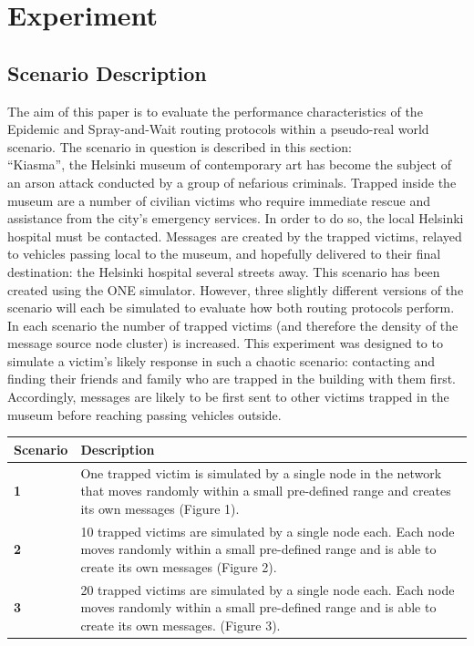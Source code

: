 \documentclass{article}
\begin{document}
\section{Experiment}
\subsection{Scenario Description}
The aim of this paper is to evaluate the performance characteristics of the Epidemic and Spray-and-Wait routing protocols within a pseudo-real world scenario. The scenario in question is described in this section:\\
\newline ``Kiasma'', the Helsinki museum of contemporary art has become the subject of an arson attack conducted by a group of nefarious criminals. Trapped inside the museum are a number of civilian victims who require immediate rescue and assistance from the city's emergency services. In order to do so, the local Helsinki hospital must be contacted. Messages are created by the trapped victims, relayed to vehicles passing local to the museum, and hopefully delivered to their final destination: the Helsinki hospital several streets away.
This scenario has been created using the ONE simulator. However, three slightly different versions of the scenario will each be simulated to evaluate how both routing protocols perform. In each scenario the number of trapped victims (and therefore the density of the message source node cluster) is increased. This experiment was designed to to simulate a victim's likely response in such a chaotic scenario: contacting and finding their friends and family who are trapped in the building with them first. Accordingly, messages are likely to be first sent to other victims trapped in the museum before reaching passing vehicles outside.

\begin{center}
\begin{tabular}{|l|p{13cm}|}
\hline
\textbf{Scenario} & \textbf{Description} \\ \hline
\textbf{1} & One trapped victim is simulated by a single node in the network that moves randomly within a small pre-defined range and creates its own messages (Figure 1). \\ \hline
\textbf{2} & 10 trapped victims are simulated by a single node each. Each node moves randomly within a small pre-defined range and is able to create its own messages (Figure 2). \\ \hline
\textbf{3} & 20 trapped victims are simulated by a single node each. Each node moves randomly within a small pre-defined range and is able to create its own messages. (Figure 3). \\ \hline
\end{tabular}
\end{center}
\end{document}
